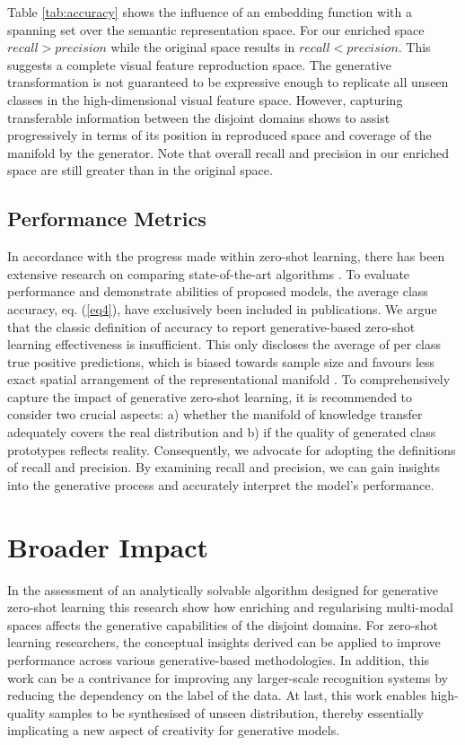 \documentclass{article}
\begin{document}
Table \ref{tab:accuracy} shows the influence of an embedding function with a spanning set over the semantic representation space. For our enriched space $recall>precision$ while the original space results in $recall<precision$. This suggests a complete visual feature reproduction space. The generative transformation is not guaranteed to be expressive enough to replicate all unseen classes in the high-dimensional visual feature space. However, capturing transferable information between the disjoint domains shows to assist progressively in terms of its position in reproduced space and coverage of the manifold by the generator.
Note that overall recall and precision in our enriched space are still greater than in the original space.

\subsection{Performance Metrics}
In accordance with the progress made within zero-shot learning, there has been extensive research on comparing state-of-the-art algorithms \cite{b56, b63}. To evaluate performance and demonstrate abilities of proposed models, the average class accuracy, eq. (\ref{eq4}), have exclusively been included in publications. We argue that the classic definition of accuracy to report generative-based zero-shot learning effectiveness is insufficient. This only discloses the average of per class true positive predictions, which is biased towards sample size and favours less exact spatial arrangement of the representational manifold \cite{b76}. To comprehensively capture the impact of generative zero-shot learning, it is recommended to consider two crucial aspects: a) whether the manifold of knowledge transfer adequately covers the real distribution and b) if the quality of generated class prototypes reflects reality. Consequently, we advocate for adopting the definitions of recall and precision. By examining recall and precision, we can gain insights into the generative process and accurately interpret the model's performance.

\section{Broader Impact}
In the assessment of an analytically solvable algorithm designed for generative zero-shot learning this research show how enriching and regularising multi-modal spaces affects the generative capabilities of the disjoint domains. For zero-shot learning researchers, the conceptual insights derived can be applied to improve performance across various generative-based methodologies. In addition, this work can be a contrivance for improving any larger-scale recognition systems by reducing the dependency on the label of the data. At last, this work enables high-quality samples to be synthesised of unseen distribution, thereby essentially implicating a new aspect of creativity for generative models.
\end{document}
